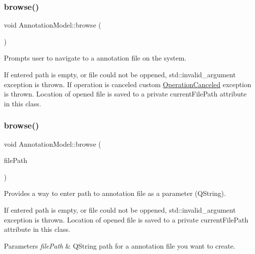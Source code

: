 \subsubsection{\texorpdfstring{browse()}{browse()}\hspace{0.1cm}{\footnotesize\ttfamily [1/2]}}
{\footnotesize\ttfamily void Annotation\+Model\+::browse (\begin{DoxyParamCaption}{ }\end{DoxyParamCaption})}



Prompts user to navigate to a annotation file on the system. 

If entered path is empty, or file could not be oppened, std\+::invalid\+\_\+argument exception is thrown. If operation is canceled custom \hyperlink{classOperationCanceled}{Operation\+Canceled} exception is thrown. Location of opened file is saved to a private current\+File\+Path attribute in this class. \mbox{\label{classAnnotationModel_a54f9ffa4151a1bdcaa1d5ab3dee87679}} 
\subsubsection{\texorpdfstring{browse()}{browse()}\hspace{0.1cm}{\footnotesize\ttfamily [2/2]}}
{\footnotesize\ttfamily void Annotation\+Model\+::browse (\begin{DoxyParamCaption}\item[{const Q\+String \&}]{file\+Path }\end{DoxyParamCaption})}



Provides a way to enter path to annotation file as a parameter (Q\+String). 

If entered path is empty, or file could not be oppened, std\+::invalid\+\_\+argument exception is thrown. Location of opened file is saved to a private current\+File\+Path attribute in this class.


\begin{DoxyParams}{Parameters}
{\em file\+Path} & Q\+String path for a annotation file you want to create. \\
\hline
\end{DoxyParams}
\mbox{\label{classAnnotationModel_ac4c6850c8d0f704c3bf5bef486992690}} 
